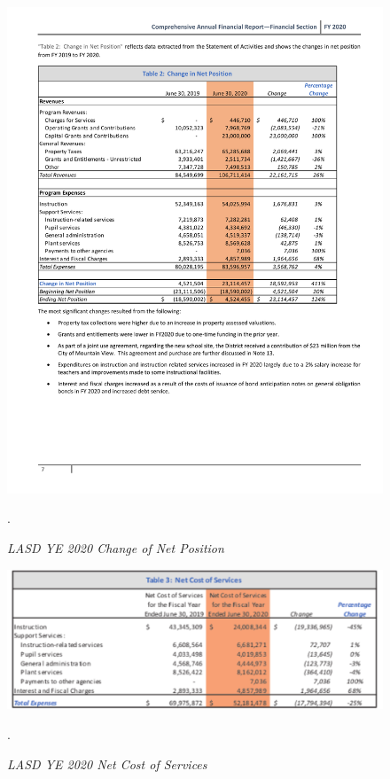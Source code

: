 \begin{figure}
  \centering
  \caption[LASD YE 2020 Change of Net Position]{\textit{LASD YE 2020 Change of Net Position}}\label{fig:Change_Position}
  \includegraphics[width=\textwidth]{CAFR-YE2020_Change_in_Net_Position}\\
  \footnotesize\raggedright\textcite[7]{Kenyon2021}.
\end{figure}

\begin{figure}
  \centering
  \caption[LASD YE 2020 Net Cost of Services]{\textit{LASD YE 2020 Net Cost of Services}}\label{fig:Cost_Services}
  \includegraphics[width=\textwidth]{CAFR-YE2020_Net_Cost_of_Services}\\
  \footnotesize\raggedright\textcite[9]{Kenyon2021}.
\end{figure}

